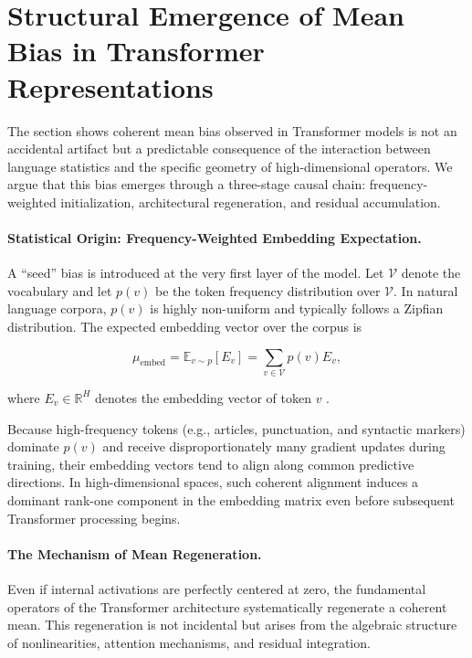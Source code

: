 \section{Structural Emergence of Mean Bias in Transformer Representations}

The section shows coherent mean bias observed in Transformer models is not an accidental artifact but a predictable consequence of the interaction between language statistics and the specific geometry of high-dimensional operators. We argue that this bias emerges through a three-stage causal chain: frequency-weighted initialization, architectural regeneration, and residual accumulation.

\paragraph{Statistical Origin: Frequency-Weighted Embedding Expectation.}

A ``seed'' bias is introduced at the very first layer of the model.
Let $\mathcal{V}$ denote the vocabulary and let $p(v)$ be the token frequency
distribution over $\mathcal{V}$.
In natural language corpora, $p(v)$ is highly non-uniform and typically
follows a Zipfian distribution.
The expected embedding vector over the corpus is

\begin{equation}
\mu_{\text{embed}}
=
\mathbb{E}_{v \sim p}[E_v]
=
\sum_{v \in \mathcal{V}} p(v) E_v,
\label{eq:embedding_mean}
\end{equation}

where $E_v \in \mathbb{R}^H$ denotes the embedding vector of token $v$
\cite{mikolov2013efficient,mikolov2013distributed,arora2017simple}.

Because high-frequency tokens (e.g., articles, punctuation, and syntactic
markers) dominate $p(v)$ and receive disproportionately many gradient updates
during training, their embedding vectors tend to align along common predictive
directions.
In high-dimensional spaces, such coherent alignment induces a dominant
rank-one component in the embedding matrix even before subsequent Transformer
processing begins.

\paragraph{The Mechanism of Mean Regeneration.}

Even if internal activations are perfectly centered at zero,
the fundamental operators of the Transformer architecture
systematically regenerate a coherent mean.
This regeneration is not incidental but arises from
the algebraic structure of nonlinearities,
attention mechanisms, and residual integration.

